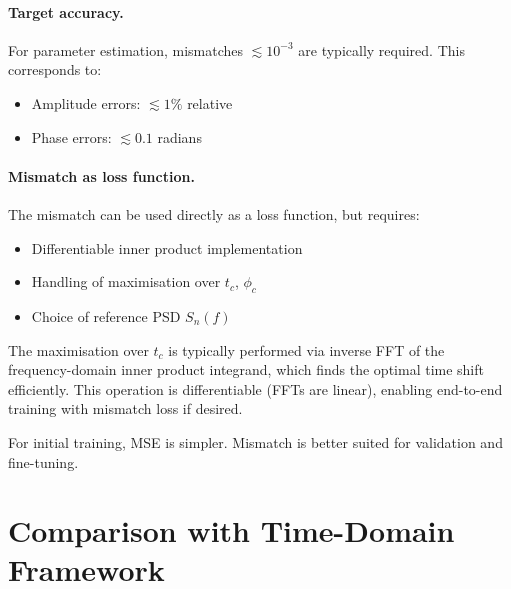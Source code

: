 \documentclass[11pt,a4paper]{article}
\begin{document}
\paragraph{Target accuracy.}
For parameter estimation, mismatches $\lesssim 10^{-3}$ are typically required. This corresponds to:
\begin{itemize}
    \item Amplitude errors: $\lesssim 1\%$ relative
    \item Phase errors: $\lesssim 0.1$ radians
\end{itemize}

\paragraph{Mismatch as loss function.}
The mismatch can be used directly as a loss function, but requires:
\begin{itemize}
    \item Differentiable inner product implementation
    \item Handling of maximisation over $t_c$, $\phi_c$
    \item Choice of reference PSD $S_n(f)$
\end{itemize}

The maximisation over $t_c$ is typically performed via inverse FFT of the frequency-domain inner product integrand, which finds the optimal time shift efficiently. This operation is differentiable (FFTs are linear), enabling end-to-end training with mismatch loss if desired.

For initial training, MSE is simpler. Mismatch is better suited for validation and fine-tuning.

\section{Comparison with Time-Domain Framework}
\label{sec:comparison}
\end{document}
